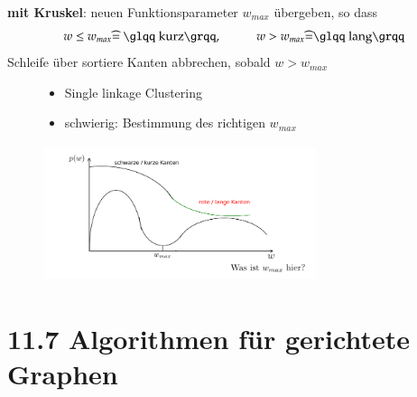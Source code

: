     \textbf{mit Kruskel}: neuen Funktionsparameter $w_{max}$ übergeben, so dass
    \[w \leq w_{max} \widehat{=}\text{ \glqq kurz\grqq},\hspace*{1cm} w > w_{max} \widehat{=} \text{\glqq lang\grqq} \]
    Schleife über sortiere Kanten abbrechen, sobald $w > w_{max}$
    \begin{figure}[htbp]
        \begin{minipage}{8cm}
            \vspace*{0mm}
            \begin{itemize}
                \item \glqq Single linkage Clustering\grqq
                \item schwierig: Bestimmung des richtigen $w_{max}$
            \end{itemize}
        \end{minipage}
        \begin{minipage}{8cm}
            \vspace*{0mm}
            \includegraphics[width=8cm,height=4cm,keepaspectratio]{./Pictures/wGraph.png}
        \end{minipage}
    \end{figure}


    \section*{11.7 Algorithmen für gerichtete Graphen}

